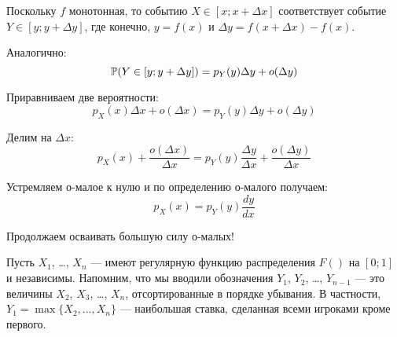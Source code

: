 Поскольку $ f $ монотонная, то событию $X\in [x;x+\Delta x]  $ соответствует событие $Y\in [y;y+\Delta y]$, где конечно, $ y=f(x) $ и $ \Delta y= f(x+\Delta x)-f(x) $.

Аналогично:
\begin{equation}
\P(Y\in [y;y+\Delta y])=p_{Y}(y)\Delta y+o(\Delta y)
\end{equation}

Приравниваем две вероятности:
\begin{equation}
p_{X}(x)\Delta x+o(\Delta x)=p_{Y}(y)\Delta y+o(\Delta y)
\end{equation}

Делим на $ \Delta x $:
\begin{equation}
p_{X}(x)+\frac{o(\Delta x)}{\Delta x}=p_{Y}(y)\frac{\Delta y}{\Delta x}+\frac{o(\Delta y)}{\Delta x}
\end{equation}

Устремляем о-малое к нулю и по определению о-малого получаем:
\begin{equation}
p_{X}(x)=p_{Y}(y)\frac{dy}{dx}
\end{equation}

Продолжаем осваивать большую силу о-малых!

Пусть $ X_{1} $, \ldots, $ X_{n} $ — имеют регулярную функцию распределения $ F() $ на $ [0;1] $ и независимы. Напомним, что мы вводили обозначения $ Y_{1} $, $ Y_{2} $, \ldots, $ Y_{n-1} $ — это величины $ X_{2} $, $ X_{3} $, \ldots, $ X_{n} $, отсортированные в порядке убывания. В частности, $ Y_{1}=\max\{X_{2},\ldots, X_{n}\} $ — наибольшая ставка, сделанная всеми игроками кроме первого.

